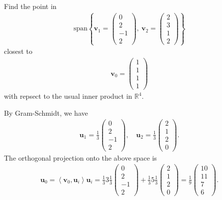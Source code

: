 \documentclass[letter-paper]{tufte-book}
\newenvironment{example}[1][Example]{\begin{trivlist}
\item[\hskip \labelsep {\bfseries #1}]}{\end{trivlist}}
\newcommand{\inner}[2]{\left\langle #1, #2\right\rangle}
\newcommand{\ub}{{\boldsymbol{u}}}
\newcommand{\vb}{{\boldsymbol{v}}}
\begin{document}
\begin{example}
  Find the point in
  \begin{align*}
    \mbox{span}\left\{\vb_1 = \begin{pmatrix} 0 \\ 2 \\ -1 \\ 2 \end{pmatrix}, \ \vb_2 = \begin{pmatrix} 2 \\ 3 \\ 1 \\ 2 \end{pmatrix}\right\}
  \end{align*}
  closest to
  \begin{align*}
    \vb_0 = \begin{pmatrix} 1 \\ 1 \\ 1 \\ 1 \end{pmatrix}
  \end{align*}
  with repsect to the usual inner product in $\mathbb{R}^4$.
  
  By Gram-Schmidt, we have
  \begin{align*}
    \ub_1 = \frac{1}{3}\begin{pmatrix} 0 \\ 2 \\ -1 \\ 2 \end{pmatrix}, \quad
    \ub_2 = \frac{1}{3}\begin{pmatrix} 2 \\ 1 \\  2 \\ 0 \end{pmatrix}.
  \end{align*}
  The orthogonal projection onto the above space is
  \begin{align*}
    \ub_0 = \inner{\vb_0}{\ub_i}\ub_i = \frac{1}{3}3\frac{1}{3}\begin{pmatrix} 0 \\ 2 \\ -1 \\ 2 \end{pmatrix} + \frac{1}{3}5\frac{1}{3}\begin{pmatrix} 2 \\ 1 \\  2 \\ 0 \end{pmatrix} = \frac{1}{9}\begin{pmatrix} 10 \\ 11 \\ 7 \\ 6 \end{pmatrix}.
  \end{align*}
  

\end{example}
\end{document}
